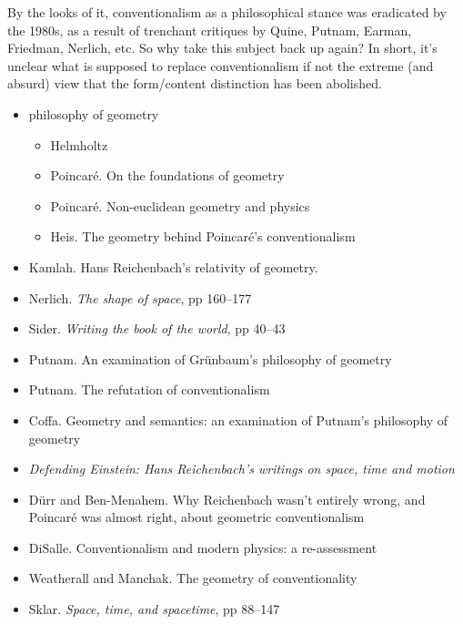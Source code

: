 \documentclass[11pt]{article}
\begin{document}
\begin{enumerate}
  By the looks of it, conventionalism as a philosophical stance was
  eradicated by the 1980s, as a result of trenchant critiques by
  Quine, Putnam, Earman, Friedman, Nerlich, etc. So why take this
  subject back up again?  In short, it's unclear what is supposed to
  replace conventionalism if not the extreme (and absurd) view that
  the form/content distinction has been abolished.
  \begin{itemize}
  \item philosophy of geometry
    \begin{itemize}
    \item Helmholtz
    \item Poincar{\'e}. On the foundations of geometry
    \item Poincar{\'e}. Non-euclidean geometry and physics
    \item Heis. The geometry behind Poincar{\'e}'s conventionalism
    \end{itemize}
  \item Kamlah. Hans Reichenbach's relativity of
    geometry. 
  \item Nerlich. \textit{The shape of space}, pp 160--177
  \item Sider. \emph{Writing the book of the world}, pp 40--43
  \item Putnam. An examination of Gr{\"u}nbaum's philosophy of
    geometry 
  \item Putnam. The refutation of conventionalism
  \item Coffa. Geometry and semantics: an examination of Putnam's
    philosophy of geometry 
  \item \emph{Defending Einstein: Hans Reichenbach's writings on
      space, time and motion}
  \item D{\"u}rr and Ben-Menahem. Why Reichenbach wasn't entirely
    wrong, and Poincar{\'e} was almost right, about geometric
    conventionalism
  \item DiSalle. Conventionalism and modern physics: a re-assessment
  \item Weatherall and Manchak. The geometry of conventionality
  \item Sklar. \textit{Space, time, and spacetime}, pp 88--147

\end{itemize}
\end{enumerate}
\end{document}
